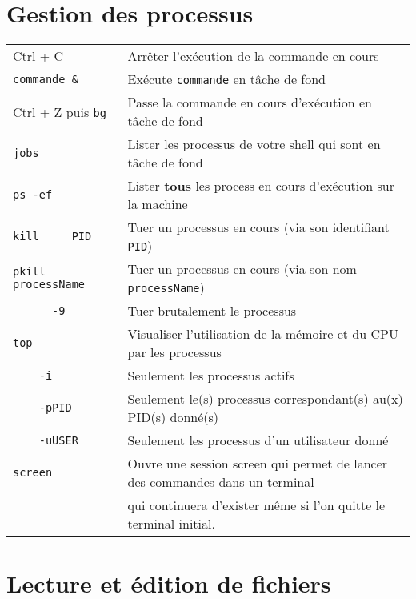 \documentclass [a4paper]{article}
\begin{document}
\section*{Gestion des processus}

\begin{tabular}{ ll }
\hline
{Ctrl + C}                          & Arrêter l'exécution de la commande en cours \\
\verb+commande &+                   & Exécute \verb+commande+ en tâche de fond \\
{Ctrl + Z puis \verb+bg+}           & Passe la commande en cours d'exécution en tâche de fond \\
{\verb+jobs+}                       & Lister les processus de votre shell qui sont en tâche de fond \\
{\verb+ps -ef+}                     & Lister \textbf{tous} les process en cours d'exécution sur la machine \\
{\verb+kill     PID+}               & Tuer un processus en cours (via son identifiant \verb+PID+)\\
{\verb+pkill    processName+}       & Tuer un processus en cours (via son nom \verb+processName+)\\
{\verb+      -9  + }                & Tuer brutalement le processus\\
{\verb+top+}                        & Visualiser l'utilisation de la mémoire et du CPU par les processus\\
{\verb+    -i +}                    & Seulement les processus actifs\\
{\verb+    -pPID+}                  & Seulement le(s) processus correspondant(s) au(x) PID(s) donné(s)\\
{\verb+    -uUSER+}                 & Seulement les processus d'un utilisateur donné\\
{\verb+screen+}                     & Ouvre une session screen qui permet de lancer des commandes dans un terminal \\
                                    & qui continuera d'exister même si l'on quitte le terminal initial.\\
\hline
\end{tabular}


\section*{Lecture et édition de fichiers}
\end{document}
